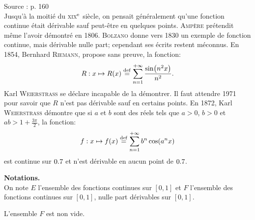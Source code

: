 
Source : \cite{contre-exemples} p. 160 \\
Jusqu'à la moitié du \textsc{xix}$^{\mathrm{e}}$ siècle, on pensait généralement qu'une fonction continue était dérivable sauf peut-être en quelques points. \textsc{Ampère} prétendit même l'avoir démontré en 1806. \textsc{Bolzano} donne vers 1830 un exemple de fonction continue, mais dérivable nulle part; cependant ses écrits restent méconnus. En 1854, Bernhard \textsc{Riemann}, propose sans preuve, la fonction:
$$R:x \mapsto R(x) \overset{\mathrm{\tiny def}}{=} \sum_{n=1}^{+\infty} \frac{\sin(n^2 x)}{n^2}.$$
Karl \textsc{Weierstrass} se déclare incapable de la démontrer. Il faut attendre 1971 pour savoir que $R$ n'est pas dérivable sauf en certains points. En 1872, Karl \textsc{Weierstrass} démontre que si $a$ et $b$ sont des réels tels que $a > 0$, $b > 0$ et $ab > 1 + \frac{3 \pi}{2}$, la fonction:
$$f : x \mapsto f(x) \overset{\mathrm{\tiny def}}{=} \sum_{n=1}^{+\infty} b^n \cos(a^n x)$$
est continue sur $0.7$ et n'est dérivable en aucun point de $0.7$.

\textbf{Notations.}\\
On note $E$ l'ensemble des fonctions continues sur $[0, 1]$ et $F$ l'ensemble des fonctions continues sur $[0, 1]$, nulle part dérivables sur $[0, 1]$. 

\begin{theo}{}
    L'ensemble $F$ est non vide.
\end{theo}

